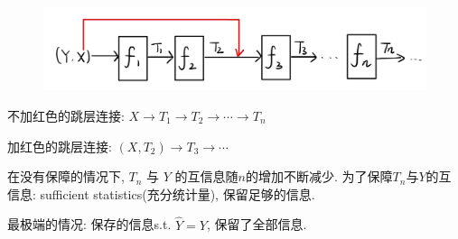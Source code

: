 \begin{figure}[htbp]
    \centering
    \includegraphics[width=\textwidth]{./figures/chapter1/data_processing.png}
\end{figure}
不加红色的跳层连接: $X\rightarrow T_1\rightarrow T_2\rightarrow\cdots\rightarrow T_n$

加红色的跳层连接: $(X, T_2)\rightarrow T_3\rightarrow\cdots$

在没有保障的情况下, $T_n$ 与 $Y$ 的互信息随$n$的增加不断减少. 为了保障$T_n$与$Y$的互信息: sufficient statistics(充分统计量), 保留足够的信息.

最极端的情况: 保存的信息s.t. $\hat{Y}=Y$, 保留了全部信息.